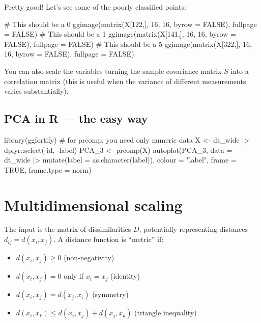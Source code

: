 \documentclass[
  letterpaper,
  DIV=11,
  numbers=noendperiod]{scrreprt}
\newenvironment{Shaded}{\begin{snugshade}}{\end{snugshade}}
\newcommand{\NormalTok}[1]{\textcolor[rgb]{0.00,0.23,0.31}{#1}}
\providecommand{\tightlist}{%
  \setlength{\itemsep}{0pt}\setlength{\parskip}{0pt}}\usepackage{longtable,booktabs,array}
\begin{document}
Pretty good! Let's see some of the poorly classified points:

\begin{Shaded}
\begin{Highlighting}[]
\NormalTok{\# This should be a 0}
\NormalTok{ggimage(matrix(X[122,], 16, 16, byrow = FALSE), fullpage = FALSE)}
\NormalTok{\# This should be a 1}
\NormalTok{ggimage(matrix(X[141,], 16, 16, byrow = FALSE), fullpage = FALSE)}
\NormalTok{\# This should be a 5}
\NormalTok{ggimage(matrix(X[322,], 16, 16, byrow = FALSE), fullpage = FALSE)}
\end{Highlighting}
\end{Shaded}

You can also scale the variables turning the sample covariance matrix
\(S\) into a correlation matrix (this is useful when the variance of
different measurements varies substantially).

\subsection{PCA in R --- the easy way}\label{pca-in-r-the-easy-way}

\begin{Shaded}
\begin{Highlighting}[]
\NormalTok{library(ggfortify)}
\NormalTok{\# for prcomp, you need only numeric data}
\NormalTok{X \textless{}{-} dt\_wide |\textgreater{} dplyr::select({-}id, {-}label)}
\NormalTok{PCA\_3 \textless{}{-} prcomp(X)}
\NormalTok{autoplot(PCA\_3, }
\NormalTok{         data = dt\_wide |\textgreater{} mutate(label = as.character(label)), }
\NormalTok{         colour = "label",}
\NormalTok{         frame = TRUE, frame.type = \textquotesingle{}norm\textquotesingle{})}
\end{Highlighting}
\end{Shaded}

\section{Multidimensional scaling}\label{multidimensional-scaling}

The input is the matrix of dissimilarities \(D\), potentially
representing distances \(d_{ij} = d(x_i, x_j)\). A distance function is
``metric'' if:

\begin{itemize}
\tightlist
\item
  \(d(x_i, x_j) \geq 0\) (non-negativity)
\item
  \(d(x_i, x_j) = 0\) only if \(x_i = x_j\) (identity)
\item
  \(d(x_i, x_j) = d(x_j, x_i)\) (symmetry)
\item
  \(d(x_i, x_k) \leq d(x_i, x_j) + d(x_j, x_k)\) (triangle inequality)
\end{itemize}
\end{document}
